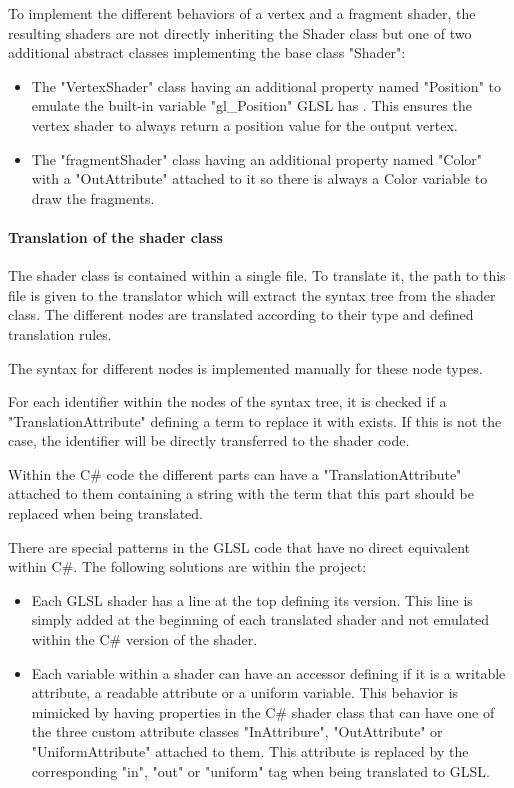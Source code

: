 To implement the different behaviors of a vertex and a fragment shader, the resulting shaders are not directly inheriting the Shader class but one of two additional abstract classes implementing the base class "Shader":
\begin{itemize}
\item The "VertexShader" class having an additional property named "Position" to emulate the built-in variable "gl\_Position" GLSL has . This ensures the vertex shader to always return a position value for the output vertex.
\item The "fragmentShader" class having an additional property named "Color" with a "OutAttribute" attached to it so there is always a Color variable to draw the fragments.
\end{itemize}

\paragraph{Translation of the shader class}

The shader class is contained within a single file. To translate it, the path to this file is given to the translator which will extract the syntax tree from the shader class. The different nodes are translated according to their type and defined translation rules.

The syntax for different nodes is implemented manually for these node types.

For each identifier within the nodes of the syntax tree, it is checked if a "TranslationAttribute" defining a term to replace it with exists. If this is not the case, the identifier will be directly transferred to the shader code.

Within the C\# code the different parts can have a "TranslationAttribute" attached to them containing a string with the term that this part should be replaced when being translated.

There are special patterns in the GLSL code that have no direct equivalent within C\#. The following solutions are within the project:
\begin{itemize}
\item Each GLSL shader has a line at the top defining its version. This line is simply added at the beginning of each translated shader and not emulated within the C\# version of the shader.
\item Each variable within a shader can have an accessor defining if it is a writable attribute, a readable attribute or a uniform variable. This behavior is mimicked by having properties in the C\# shader class that can have one of the three custom attribute classes "InAttribure", "OutAttribute" or "UniformAttribute" attached to them. This attribute is replaced by the corresponding "in", "out" or "uniform" tag when being translated to GLSL.
\end{itemize}

